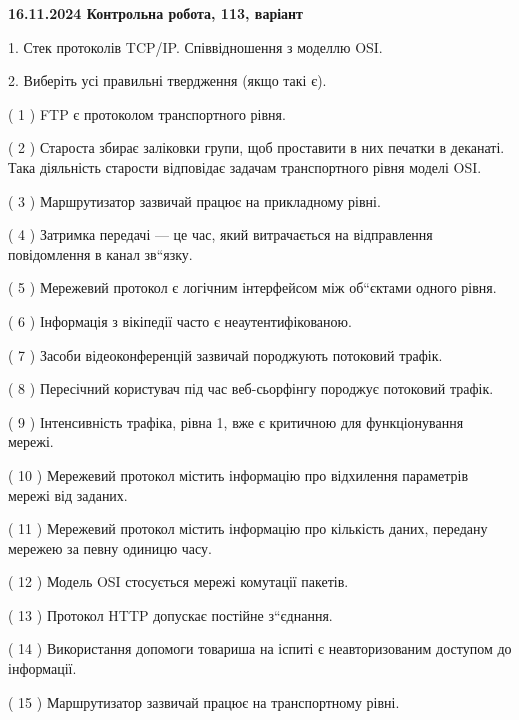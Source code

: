 \documentclass[12pt, ukrainian]{article}
\begin{document}
\vspace{4mm}
\newpage
\begin {large}

\textbf{16.11.2024 Контрольна робота, 113, варіант  }\par


{
1. Стек протоколів TCP/IP. Співвідношення з моделлю OSI.



\vspace{5mm}
2. Виберіть усі правильні твердження (якщо такі є).\par
\vspace{2mm}

( 1 ) FTP є протоколом транспортного рівня.

( 2 ) Староста збирає заліковки групи, щоб проставити в них печатки в деканаті. Така діяльність старости відповідає задачам транспортного рівня моделі OSI.

( 3 ) Маршрутизатор зазвичай працює на прикладному рівні.

( 4 ) Затримка передачі — це час, який витрачається на відправлення повідомлення в канал зв“язку.

( 5 ) Мережевий протокол є логічним інтерфейсом між об“єктами одного рівня.

( 6 ) Інформація з вікіпедії часто є неаутентифікованою.

( 7 ) Засоби відеоконференцій зазвичай породжують потоковий трафік.

( 8 ) Пересічний користувач під час веб-сьорфінгу породжує потоковий трафік.

( 9 ) Інтенсивність трафіка, рівна 1, вже є критичною для функціонування мережі.

( 10 ) Мережевий протокол містить інформацію про відхилення параметрів мережі від заданих.

( 11 ) Мережевий протокол містить інформацію про кількість даних, передану мережею за певну одиницю часу.

( 12 ) Модель OSI стосується мережі комутації пакетів.

( 13 ) Протокол  HTTP допускає постійне з“єднання.

( 14 ) Використання допомоги товариша на іспиті є неавторизованим доступом до інформації.

( 15 ) Маршрутизатор зазвичай працює на транспортному рівні.
}
\end {large}
\end{document}
